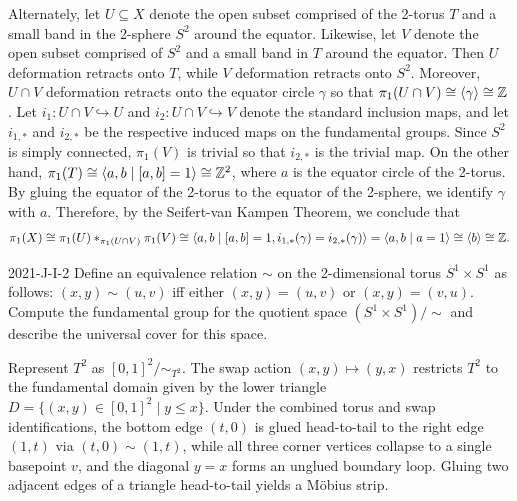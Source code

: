 \documentclass{article}
\begin{document}
	Alternately, let $U \subseteq X$ denote the open subset comprised of the 2-torus $T$ and a small band in the 2-sphere $S^2$ around the equator. Likewise, let $V$ denote the open subset comprised of $S^2$ and a small band in $T$ around the equator. Then $U$ deformation retracts onto $T$, while $V$ deformation retracts onto $S^2$. Moreover, $U \cap V$ deformation retracts onto the equator circle $\gamma$ so that $\pi_{1}(U \cap V) \cong \braket{\gamma} \cong \mathbb{Z}$. Let $i_{1}: U \cap V \hookrightarrow U$ and $i_{2}: U \cap V \hookrightarrow V$ denote the standard inclusion maps, and let $i_{1,\ast}$ and $i_{2,\ast}$ be the respective induced maps on the fundamental groups. Since $S^{2}$ is simply connected, $\pi_{1}(V)$ is trivial so that $i_{2,\ast}$ is the trivial map. On the other hand, $\pi_{1}(T) \cong \braket{a, b \mid [a,b]= 1} \cong \mathbb{Z}^{2}$, where $a$ is the equator circle of the 2-torus. By gluing the equator of the 2-torus to the equator of the 2-sphere, we identify $\gamma$ with $a$. Therefore, by the Seifert-van Kampen Theorem, we conclude that 
	\begin{equation*}
		\pi_{1}(X) \cong \pi_{1}(U) \ast_{\pi_{1}(U \cap V)} \pi_{1}(V) \cong \braket{a, b \mid [a, b] = 1, i_{1, \ast}(\gamma) = i_{2,\ast}(\gamma)} = \braket{a , b \mid a = 1} \cong \braket{b} \cong \mathbb{Z}. 
	\end{equation*}
	
	\begin{prb}{2021-J-I-2}
		Define an equivalence relation $\sim$ on the 2-dimensional torus $S^{1} \times S^{1}$ as follows: $(x, y) \sim (u, v)$ iff either $(x, y)= (u, v)$ or $(x, y) = (v, u)$. Compute the fundamental group for the quotient space $(S^{1}\times S^{1})/\sim$ and describe the universal cover for this space. 
	\end{prb}
	Represent $T^2$ as $[0,1]^2 / \sim_{T^2}$. The swap action $(x,y) \mapsto (y,x)$ restricts $T^2$ to the fundamental domain given by the lower triangle $D = \{(x,y) \in [0,1]^2 \mid y \le x\}$. Under the combined torus and swap identifications, the bottom edge $(t,0)$ is glued head-to-tail to the right edge $(1,t)$ via $(t,0) \sim (1,t)$, while all three corner vertices collapse to a single basepoint $v$, and the diagonal $y=x$ forms an unglued boundary loop. Gluing two adjacent edges of a triangle head-to-tail yields a Möbius strip.
	
\end{document}
